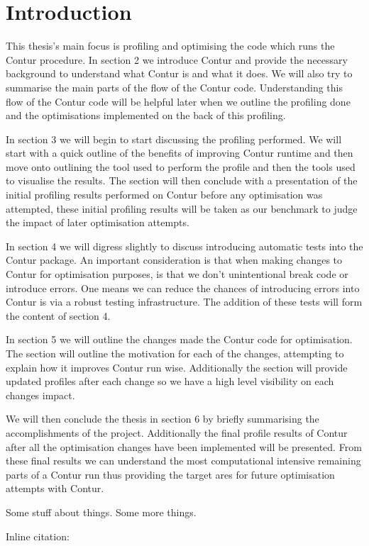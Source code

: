 \chapter{Introduction}
\label{chapterlabel1}

This thesis's main focus is profiling and optimising the code which runs the Contur procedure. In section 2 we introduce Contur and provide the necessary background to understand what Contur is and what it does. We will also try to summarise the main parts of the flow of the Contur code. Understanding this flow of the Contur code will be helpful later when we outline the profiling done and the optimisations implemented on the back of this profiling. 

In section 3 we will begin to start discussing the profiling performed. We will start with a quick outline of the benefits of improving Contur runtime and then move onto outlining the tool used to perform the profile and then the tools used to visualise the results. The section will then conclude with a presentation of the initial profiling results performed on Contur before any optimisation was attempted, these initial profiling results will be taken as our benchmark to judge the impact of later optimisation attempts.

In section 4 we will digress slightly to discuss introducing automatic tests into the Contur package. An important consideration is that when making changes to Contur for optimisation purposes, is that we don't unintentional break code or introduce errors. One means we can reduce the chances of introducing errors into Contur is via a robust testing infrastructure. The addition of these tests will form the content of section 4.

In section 5 we will outline the changes made the Contur code for optimisation. The section will outline the motivation for each of the changes, attempting to explain how it improves Contur run wise. Additionally the section will provide updated profiles after each change so we have a high level visibility on each changes impact.

We will then conclude the thesis in section 6 by briefly summarising the accomplishments of the project. Additionally the final profile results of Contur after all the optimisation changes have been implemented will be presented. From these final results we can understand the most computational intensive remaining parts of a Contur run thus providing the target ares for future optimisation attempts with Contur.  

Some stuff about things.\cite{example-citation} Some more things. 

Inline citation: 

